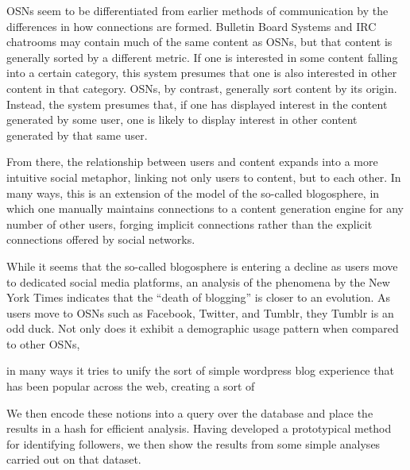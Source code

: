 OSNs seem to be differentiated from earlier methods of communication by 
the differences in how connections are formed.  Bulletin Board Systems and
IRC chatrooms may contain much of the same content as OSNs, but that 
content is generally sorted by a different metric.  If one is interested in 
some content falling into a certain category, this system presumes that one is 
also interested in other content in that category.  OSNs, by contrast, 
generally sort content by its origin.  Instead, the system presumes that, 
if one has displayed interest in the content generated by some user, one is 
likely to display interest in other content generated by that same user.

From there, the relationship between users and content expands into a 
more intuitive social metaphor, linking not only users to content, but 
to each other.  In many ways, this is an extension of the model of the 
so-called blogosphere, in which one manually maintains connections to 
a content generation engine for any number of other users, forging 
implicit connections rather than the explicit connections offered by 
social networks. 



While it seems that the so-called blogosphere is entering a decline 
as users move to dedicated social media platforms, an analysis of the 
phenomena by the New York Times\cite{kopytoff2011blogs} indicates that 
the ``death of blogging'' is closer to an evolution.  As users move to 
OSNs such as Facebook, Twitter, and Tumblr, they
Tumblr is an odd duck.  Not only does it exhibit a demographic usage 
pattern when compared to other OSNs,

 in many ways it tries to unify 
the sort of simple wordpress blog experience that has been popular 
across the web, creating a sort of 

We then encode these notions into a query over the database and place 
the results in a hash for efficient analysis.  Having developed a 
prototypical method for identifying followers, we then show the 
results from some simple analyses carried out on that dataset.






